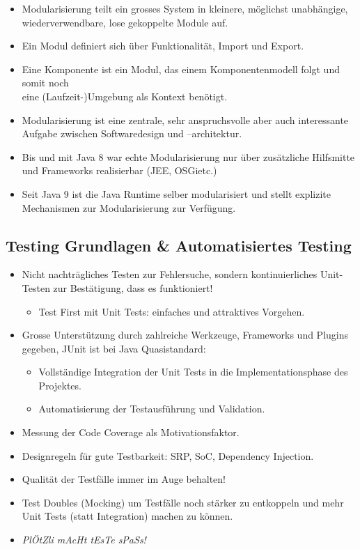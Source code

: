 \documentclass[a4paper]{article}
\begin{document}
			\begin{itemize}
				\item Modularisierung teilt ein grosses System in kleinere, möglichst unabhängige, wiederverwendbare, lose gekoppelte Module auf.
				\item Ein Modul definiert sich über Funktionalität, Import und Export.
				\item Eine Komponente ist ein Modul, das einem Komponentenmodell folgt und somit noch \\ 
				eine (Laufzeit-)Umgebung als Kontext benötigt.
				\item Modularisierung ist eine zentrale, sehr anspruchsvolle aber auch interessante Aufgabe zwischen Softwaredesign und –architektur.
				\item Bis und mit Java 8 war echte Modularisierung nur über zusätzliche Hilfsmitte und Frameworks realisierbar (JEE, OSGietc.)
				\item Seit Java 9 ist die Java Runtime selber modularisiert und stellt explizite Mechanismen zur Modularisierung zur Verfügung.
			\end{itemize}
		
		\subsection{Testing Grundlagen \& Automatisiertes Testing}
		
			\begin{itemize}
				\item Nicht nachträgliches Testen zur Fehlersuche, sondern kontinuierliches Unit-Testen zur Bestätigung, dass es funktioniert!
					\begin{itemize}
						\item Test First mit Unit Tests: einfaches und attraktives Vorgehen.
					\end{itemize}
				\item Grosse Unterstützung durch zahlreiche Werkzeuge, Frameworks und Plugins gegeben, JUnit ist bei Java Quasistandard:
					\begin{itemize}
						\item Vollständige Integration der Unit Tests in die Implementationsphase des Projektes.
						\item Automatisierung der Testausführung und Validation.
					\end{itemize}
				\item Messung der Code Coverage als Motivationsfaktor.
				\item Designregeln für gute Testbarkeit: SRP, SoC, Dependency Injection.
				\item Qualität der Testfälle immer im Auge behalten!
				\item Test Doubles (Mocking) um Testfälle noch stärker zu entkoppeln und mehr Unit Tests (statt Integration) machen zu können.
				\item \textit{PlÖtZli mAcHt tEsTe sPaSs!}
			\end{itemize}
		
\end{document}
